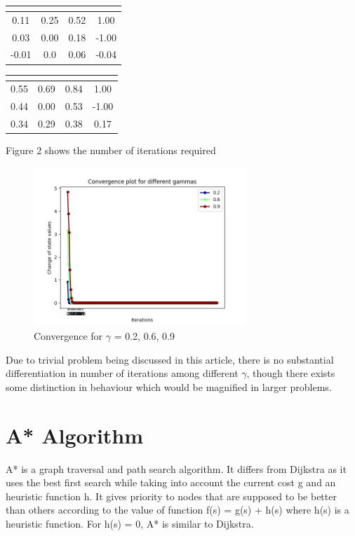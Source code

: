 \documentclass[10pt,a4paper,twocolumn]{article}
\begin{document}
		\begin{center}
		\begin{tabular}{ c c c c}
						 \hline
			\multicolumn{4}{|c|}{  \text{$\gamma = 0.6$} } \\
			\hline
			0.11 & 0.25 & 0.52 &1.00 \\ 
			0.03 & 0.00 & 0.18 & -1.00  \\  
			-0.01 &  0.0 & 0.06 & -0.04    
		\end{tabular}
	\end{center}

	\begin{center}
	\begin{tabular}{ c c c c}
		\hline
		\multicolumn{4}{|c|}{  \text{$\gamma = 0.9$} } \\
		\hline
		0.55  & 0.69  & 0.84 & 1.00 \\ 
		0.44  & 0.00  & 0.53  & -1.00 \\  
		0.34 &  0.29 & 0.38 & 0.17    
	\end{tabular}
\end{center}

Figure 2 shows the number of iterations required

	\begin{figure}[ht!]
		\centering
		\includegraphics[width=80mm]{gammas}
		\caption{Convergence for $\gamma$ = 0.2, 0.6, 0.9 }
	\end{figure}

	
	Due to trivial problem being discussed in this article, there is no substantial differentiation in number of iterations among different $\gamma$, though there exists some distinction in behaviour which would be magnified in larger problems.

	\section{A* Algorithm}
	A* is a graph traversal and path search algorithm. It differs from Dijkstra as it uses the best first search while taking into account the current cost g and an heuristic function h. It gives priority to nodes that are supposed to be better than others according to the value of function f(s) = g(s) + h(s) where h(s) is a heuristic function. For h(s) = 0, A* is similar to Dijkstra.
	
\end{document}
